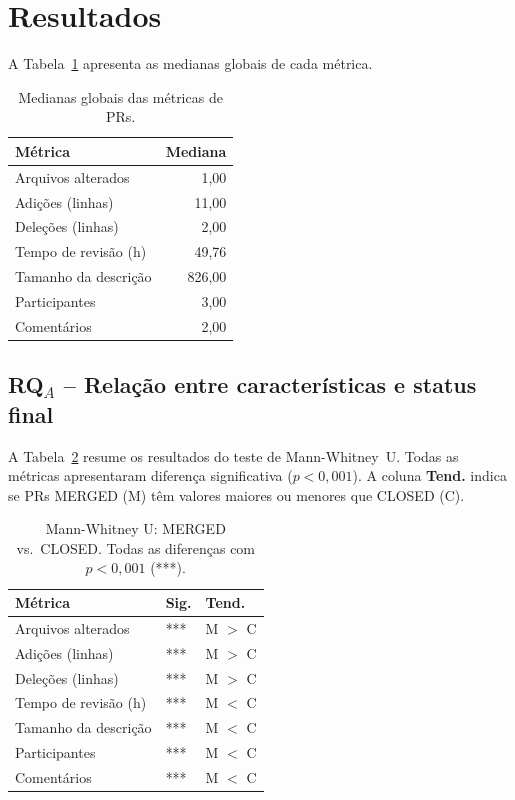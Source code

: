 \documentclass[10pt,a4paper,twocolumn]{article}
\begin{document}
\section{Resultados}

A Tabela~\ref{tab:medians} apresenta as medianas globais de cada métrica.

\begin{table}[H]
  \centering
  \caption{Medianas globais das métricas de PRs.}
  \label{tab:medians}
  \begin{tabular}{lr}
    \toprule
    \textbf{Métrica} & \textbf{Mediana} \\
    \midrule
    Arquivos alterados & 1,00 \\
    Adições (linhas) & 11,00 \\
    Deleções (linhas) & 2,00 \\
    Tempo de revisão (h) & 49,76 \\
    Tamanho da descrição & 826,00 \\
    Participantes & 3,00 \\
    Comentários & 2,00 \\
    \bottomrule
  \end{tabular}
\end{table}

\subsection{RQ$_A$ -- Relação entre características e status final}

A Tabela~\ref{tab:rqa} resume os resultados do teste de Mann-Whitney~U.
Todas as métricas apresentaram diferença significativa ($p < 0{,}001$).
A coluna \textbf{Tend.} indica se PRs MERGED (M) têm valores maiores ou
menores que CLOSED (C).

\begin{table}[H]
  \centering
  \caption{Mann-Whitney U: MERGED vs.\ CLOSED. Todas as diferenças com $p<0{,}001$ (***).}
  \label{tab:rqa}
  \small
  \begin{tabular}{lll}
    \toprule
    \textbf{Métrica} & \textbf{Sig.} & \textbf{Tend.} \\
    \midrule
    Arquivos alterados & *** & M $>$ C \\
    Adições (linhas) & *** & M $>$ C \\
    Deleções (linhas) & *** & M $>$ C \\
    Tempo de revisão (h) & *** & M $<$ C \\
    Tamanho da descrição & *** & M $<$ C \\
    Participantes & *** & M $<$ C \\
    Comentários & *** & M $<$ C \\
    \bottomrule
  \end{tabular}
\end{table}
\end{document}
